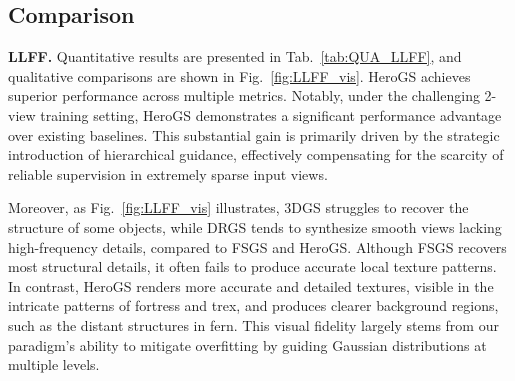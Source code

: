 \subsection{Comparison}
\textbf{LLFF.}
Quantitative results are presented in Tab.~\ref{tab:QUA_LLFF}, and qualitative comparisons are shown in Fig.~\ref{fig:LLFF_vis}. HeroGS achieves superior performance across multiple metrics. Notably, under the challenging 2-view training setting, HeroGS demonstrates a significant performance advantage over existing baselines. This substantial gain is primarily driven by the strategic introduction of hierarchical guidance, effectively compensating for the scarcity of reliable supervision in extremely sparse input views.

Moreover, as Fig.~\ref{fig:LLFF_vis} illustrates, 3DGS struggles to recover the structure of some objects, while DRGS tends to synthesize smooth views lacking high-frequency details, compared to FSGS and HeroGS. Although FSGS recovers most structural details, it often fails to produce accurate local texture patterns. In contrast, HeroGS renders more accurate and detailed textures, visible in the intricate patterns of fortress and trex, and produces clearer background regions, such as the distant structures in fern. This visual fidelity largely stems from our paradigm’s ability to mitigate overfitting by guiding Gaussian distributions at multiple levels.



